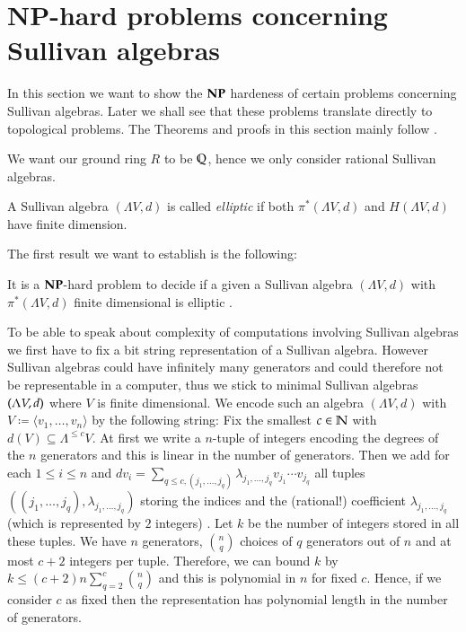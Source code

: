 \section{NP-hard problems concerning Sullivan algebras} \label{sec:NPSullivan}
 
 In this section we want to show the 
 $\mathbf{NP}$ hardeness of certain problems concerning Sullivan algebras. Later we shall see that these problems
 translate directly to topological problems. The Theorems and proofs in this section mainly follow  \cite{Lechuga2000}.
 
 We want our ground ring $R$ to be  $\mathbb{Q}$, hence we only consider rational Sullivan algebras.
 
 \begin{Definition}
  A Sullivan algebra $(\Lambda V, d)$ is called \emph{elliptic} if both $\pi^*(\Lambda V,d)$ and $H(\Lambda V,d)$ have
  finite dimension.
 \end{Definition}
 
 The first result we want to establish is the following:
 
 \begin{Theorem}
 \label{thm:DecidingEllipticityIsNpHard}
  It is a $\mathbf{NP}$-hard problem to decide if a given a Sullivan algebra $(\Lambda V,d)$ with $\pi^*(\Lambda V,d)$ finite dimensional 
  is elliptic . 
 \end{Theorem}
 
 \begin{Remark}
 \label{rem:CodingOfSullivanAlgebras}
  To be able to speak about complexity of computations involving Sullivan algebras we first have to fix a bit string 
  representation of a Sullivan algebra. However Sullivan algebras could have infinitely many generators and could therefore
  not be representable in a computer, thus we stick to minimal Sullivan algebras $(\Lambda V,d)$ where $V$ is finite dimensional. 
  We encode such an algebra $(\Lambda V, d)$ with $V \coloneqq \langle v_1, \ldots , v_n \rangle$
  by the following string: \newline
  Fix the smallest $c \in \mathbb{N}$ with $d(V) \subseteq \Lambda^{ \leq c} V$.
  At first we write a $n$-tuple of integers encoding the degrees of the $n$ generators and this is linear in the number
  of generators. Then we add for each $ 1 \leq i \leq n$
  and $d v_i = \sum_{q \leq c, (j_1, \ldots, j_q)} \lambda_{j_1, \ldots, j_q} v_{j_1} \cdots v_{j_q}$ all tuples 
  $(({j_1, \ldots, j_q}), \lambda_{j_1, \ldots, j_q})$ storing the indices and the (rational!) coefficient 
  $\lambda_{j_1, \ldots, j_q}$ (which is represented by $2$ integers)
  . Let $k$ be the number of integers stored in all these tuples. We have $n$ generators,
  ${ n \choose q}$ choices of $q$ generators out of $n$ and at most $c + 2$ integers per tuple. Therefore, we can bound $k$ by
  $k \leq (c + 2)n \sum_{q = 2}^c { n \choose q} $ and this is polynomial in $n$ for fixed $c$.
  Hence, if we consider $c$ as fixed then the representation has polynomial length in the number
  of generators.
  
 \end{Remark}
 


